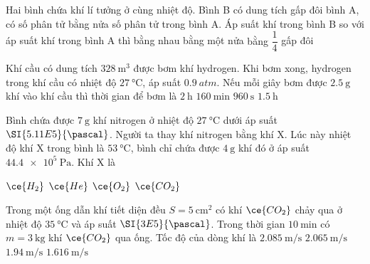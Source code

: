 \begin{ex}
Hai bình chứa khí lí tưởng ở cùng nhiệt độ. Bình B có dung tích gấp đôi bình A, có số phân tử bằng nửa số phân tử trong bình A. Áp suất khí trong bình B so với áp suất khí trong bình A thì	
	\choice
	{bằng nhau}
	{bằng một nửa}
	{\True bằng $\dfrac{1}{4}$}
	{gấp đôi}
	\loigiai{}
\end{ex}
\begin{ex}
Khí cầu có dung tích $\SI{328}{\meter^3}$ được bơm khí hydrogen. Khi bơm xong, hydrogen trong khí cầu có nhiệt độ $\SI{27}{\celsius}$, áp suất $\SI{0.9}{atm}$. Nếu mỗi giây bơm được $\SI{2.5}{\gram}$ khí vào khí cầu thì thời gian để bơm là	
	\choice
	{$\SI{2}{\hour}$}
	{\True $\SI{160}{\minute}$}
	{$\SI{960}{\second}$}
	{$\SI{1.5}{\hour}$}
	\loigiai{}
\end{ex}
\begin{ex}
	Bình chứa được $\SI{7}{\gram}$ khí nitrogen ở nhiệt độ $\SI{27}{\celsius}$ dưới áp suất $\SI{5.11E5}{\pascal}$. Người ta thay khí nitrogen bằng khí X. Lúc này nhiệt độ khí X trong bình là $\SI{53}{\celsius}$, bình chỉ chứa được $\SI{4}{\gram}$ khí đó ở áp suất $\SI{44.4e5}{\pascal}$. Khí X là 
	
	\choice
	{\True $\ce{H_2}$}
	{$\ce{He}$}
	{$\ce{O_2}$}
	{$\ce{CO_2}$}
	\loigiai{}
\end{ex}
\begin{ex}
	Trong một ống dẫn khí tiết diện đều $S=\SI{5}{\centi\meter^2}$ có khí $\ce{CO_2}$ chảy qua ở nhiệt độ $\SI{35}{\celsius}$ và áp suất $\SI{3E5}{\pascal}$. Trong thời gian $\SI{10}{\minute}$ có $m=\SI{3}{\kilogram}$ khí $\ce{CO_2}$ qua ống. Tốc độ của dòng khí là
	\choice
	{$\SI{2.085}{\meter/\second}$}
	{$\SI{2.065}{\meter/\second}$}
	{\True $\SI{1.94}{\meter/\second}$}
	{$\SI{1.616}{\meter/\second}$}
\end{ex}
